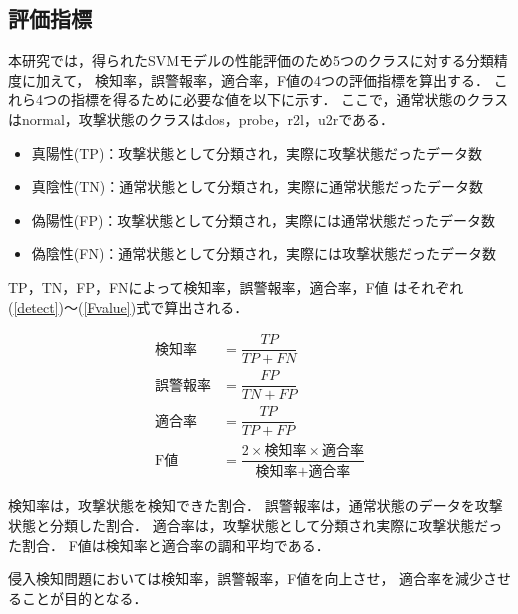 \subsection{評価指標}
本研究では，得られたSVMモデルの性能評価のため5つのクラスに対する分類精度に加えて，
検知率，誤警報率，適合率，F値の4つの評価指標を算出する．
これら4つの指標を得るために必要な値を以下に示す．
ここで，通常状態のクラスはnormal，攻撃状態のクラスはdos，probe，r2l，u2rである．
\begin{itemize}
    \item 真陽性(TP)：攻撃状態として分類され，実際に攻撃状態だったデータ数
    \item 真陰性(TN)：通常状態として分類され，実際に通常状態だったデータ数
    \item 偽陽性(FP)：攻撃状態として分類され，実際には通常状態だったデータ数
    \item 偽陰性(FN)：通常状態として分類され，実際には攻撃状態だったデータ数
\end{itemize}
TP，TN，FP，FNによって検知率，誤警報率，適合率，F値
はそれぞれ(\ref{detect})〜(\ref{Fvalue})式で算出される．

\setlength{\jot}{12pt}
\begin{align}
\text{検知率} &= \dfrac{TP}{TP + FN}\label{detect}\\
\text{誤警報率} &= \dfrac{FP}{TN + FP}\\
\text{適合率} &= \dfrac{TP}{TP + FP}\\
\text{F値} &= \dfrac{2\times\text{検知率}\times\text{適合率}}{\text{検知率}+\text{適合率}}\label{Fvalue}
\end{align}

検知率は，攻撃状態を検知できた割合．
誤警報率は，通常状態のデータを攻撃状態と分類した割合．
適合率は，攻撃状態として分類され実際に攻撃状態だった割合．
F値は検知率と適合率の調和平均である．

侵入検知問題においては検知率，誤警報率，F値を向上させ，
適合率を減少させることが目的となる．
